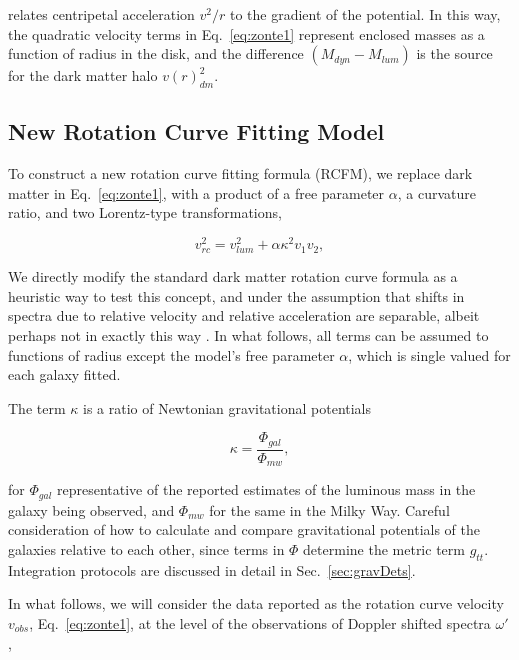 \documentclass[reprint,%
 amsmath,amssymb,
 aps,
]{revtex4-1}
\begin{document}
  relates centripetal acceleration $v^2/r$ to the gradient of the potential.   In this way, the  quadratic velocity terms in   Eq.~\ref{eq:zonte1} represent enclosed masses as a function of radius in the disk, and the 
 difference $(M_{dyn}-M_{lum})$  is 
  the source   for the dark matter halo  
 $v(r)^2_{dm}$.  



\subsection{New Rotation Curve Fitting Model}



 
 To construct a new  rotation curve fitting formula (RCFM), we   replace dark matter  in  Eq.~\ref{eq:zonte1}, 
  with   a product of a free parameter $\alpha$,  a curvature ratio, and two  Lorentz-type transformations,   
   

\begin{equation}
v_{rc}^2 =  v_{lum}^2+\alpha \kappa^2 v_{1} v_{2} , 
\label{eq:zonteLCM}
\end{equation}  


We  directly modify  the standard dark matter rotation curve formula as a heuristic way to test this concept, and    
under the assumption that shifts in   spectra due to relative velocity and relative acceleration are separable, albeit perhaps not in exactly this way \cite{Jack,Cisn}.
 In what follows, all   terms  can be assumed to   functions of radius except the model's free parameter $\alpha$,  which is single valued for each galaxy fitted.

  
 The term $\kappa$ 
is a ratio of Newtonian gravitational potentials 

 \begin{equation}
\kappa=\frac{\Phi_{gal}}{\Phi_{mw}}, 
\label{eq:kappa2}  
\end{equation}  

 for $\Phi_{gal}$ representative of the reported estimates of the luminous mass in the galaxy being observed, and $\Phi_{mw}$ for the same in  the Milky Way.  Careful consideration of how to calculate and compare   gravitational potentials of   the galaxies relative to each other, since terms in $\Phi$ determine the metric term $g_{tt}$. Integration protocols are discussed in detail in Sec.~\ref{sec:gravDets}.
 

 
 In what follows, we will consider the data reported as the rotation curve velocity $v_{obs}$, Eq.~\ref{eq:zonte1}, at the level of the   observations of  Doppler shifted spectra $\omega'$, 
\end{document}

